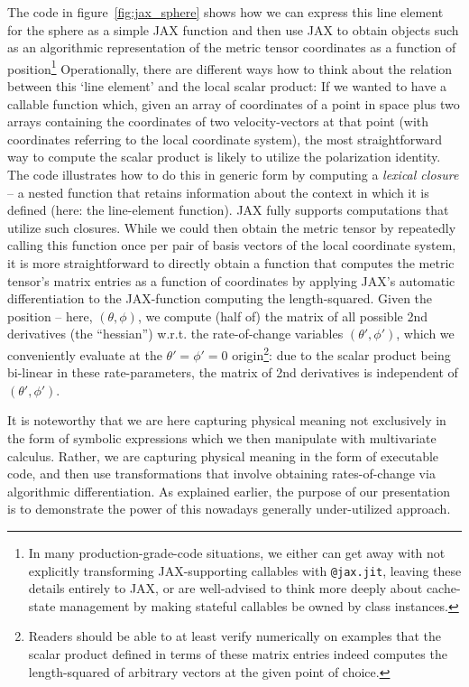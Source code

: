 \documentclass[twocolumn]{article}
\begin{document}
The code in figure~\ref{fig:jax_sphere} shows how we can express this
line element for the sphere as a simple JAX function and then use JAX
to obtain objects such as an algorithmic representation of the metric
tensor coordinates as a function of position\footnote{In many
production-grade-code situations, we either can get away with not
explicitly transforming JAX-supporting callables with
\texttt{@jax.jit}, leaving these details entirely to JAX, or are
well-advised to think more deeply about cache-state management by
making stateful callables be owned by class instances.}
Operationally, there are different ways how to think about the
relation between this `line element' and the local scalar product: If
we wanted to have a callable function which, given an array of
coordinates of a point in space plus two arrays containing the
coordinates of two velocity-vectors at that point (with coordinates
referring to the local coordinate system), the most straightforward
way to compute the scalar product is likely to utilize the
polarization identity. The code illustrates how to do this in generic
form by computing a \emph{lexical closure} -- a nested function that
retains information about the context in which it is defined (here:
the line-element function). JAX fully supports computations that
utilize such closures. While we could then obtain the metric tensor by
repeatedly calling this function once per pair of basis vectors of the
local coordinate system, it is more straightforward to directly obtain
a function that computes the metric tensor's matrix entries as a
function of coordinates by applying JAX's automatic differentiation to
the JAX-function computing the length-squared. Given the position --
here, $(\theta, \phi)$, we compute (half of) the matrix of all
possible 2nd derivatives (the ``hessian'') w.r.t. the rate-of-change
variables $(\theta', \phi')$, which we conveniently evaluate at the
$\theta'=\phi'=0$ origin\footnote{Readers should be able to at least
verify numerically on examples that the scalar product defined in
terms of these matrix entries indeed computes the length-squared of
arbitrary vectors at the given point of choice.}: due to the scalar
product being bi-linear in these rate-parameters, the matrix of 2nd
derivatives is independent of $(\theta', \phi')$.

It is noteworthy that we are here capturing physical meaning not
exclusively in the form of symbolic expressions which we then
manipulate with multivariate calculus. Rather, we are capturing
physical meaning in the form of executable code, and then use
transformations that involve obtaining rates-of-change via algorithmic
differentiation. As explained earlier, the purpose of our presentation
is to demonstrate the power of this nowadays generally under-utilized
approach.
\end{document}
